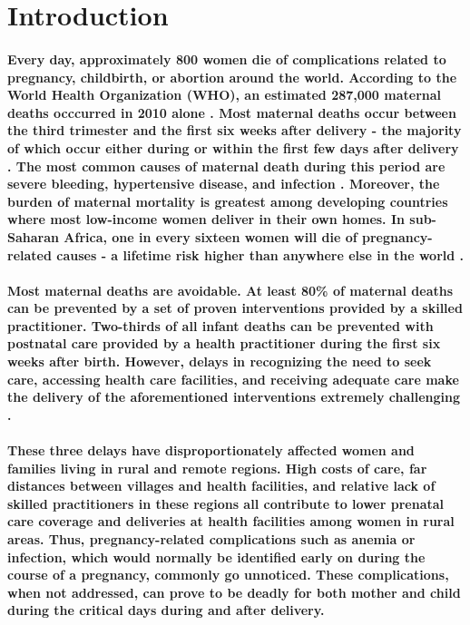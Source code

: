 \section{Introduction}
\paragraph{Every day, approximately 800 women die of complications related to pregnancy, childbirth, or abortion around the world. According to the World Health Organization (WHO), an estimated 287,000 maternal deaths occcurred in 2010 alone \citep{WHO2012}. Most maternal deaths occur between the third trimester and the first six weeks after delivery - the majority of which occur either during or within the first few days after delivery \citep{WHO2012}. The most common causes of maternal death during this period are severe bleeding, hypertensive disease, and infection \citep{WHO2012}. Moreover, the burden of maternal mortality is greatest among developing countries where most low-income women deliver in their own homes. In sub-Saharan Africa, one in every sixteen women will die of pregnancy-related causes - a lifetime risk higher than anywhere else in the world \citep{Ronsmans2006}.}

\paragraph{Most maternal deaths are avoidable. At least 80\% of maternal deaths can be prevented by a set of proven interventions provided by a skilled practitioner. Two-thirds of all infant deaths can be prevented with postnatal care provided by a health practitioner during the first six weeks after birth. However, delays in recognizing the need to seek care, accessing health care facilities, and receiving  adequate care make the delivery of the aforementioned interventions extremely challenging \citep{Thaddeus1994}. }

\paragraph{These three delays have disproportionately affected women and families living in rural and remote regions. High costs of care, far distances between villages and health facilities, and relative lack of skilled practitioners in these regions all contribute to lower prenatal care coverage and deliveries at health facilities among women in rural areas. Thus, pregnancy-related complications such as anemia or infection, which would normally be identified early on during the course of a pregnancy, commonly go unnoticed. These complications, when not addressed, can prove to be deadly for both mother and child during the critical days during and after delivery.}

